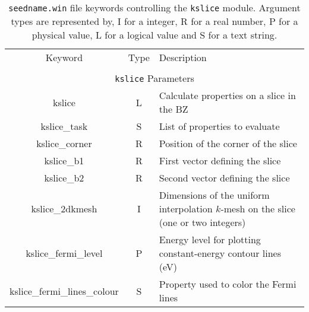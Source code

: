 \begin{table}[hH!]
\begin{center}
\begin{tabular}{|c|c|p{6cm}|}
  \hline
  Keyword & Type & Description \\
  &      &             \\
  \hline\hline
  \multicolumn{3}{|c|}{{\tt kslice} Parameters} \\
  \hline
  {\sc kslice}  & L & Calculate properties on a slice in the BZ \\
  {\sc kslice\_task}& S & List of properties to evaluate\\
  {\sc kslice\_corner}& R & Position of the corner of the slice\\
  {\sc kslice\_b1}& R & First vector defining the slice\\
  {\sc kslice\_b2}& R & Second vector defining the slice\\
  {\sc kslice\_2dkmesh}& I & Dimensions of the uniform interpolation 
  $k$-mesh on the slice (one or two integers)\\
  {\sc kslice\_fermi\_level}& P & Energy level for  plotting 
  constant-energy contour lines (eV)\\
  {\sc kslice\_fermi\_lines\_colour}& S & Property used to color the Fermi 
  lines\\
  \hline
\end{tabular}
\caption[Parameter file keywords controlling the kslice module.]
{{\tt seedname.win} file keywords controlling the {\tt kslice}
  module. Argument types are represented by, I for a integer, R for a
  real number, P for a physical value, L for a logical value and S for
  a text string.}
\label{parameter_keywords_kslice}
\end{center}
\end{table}



